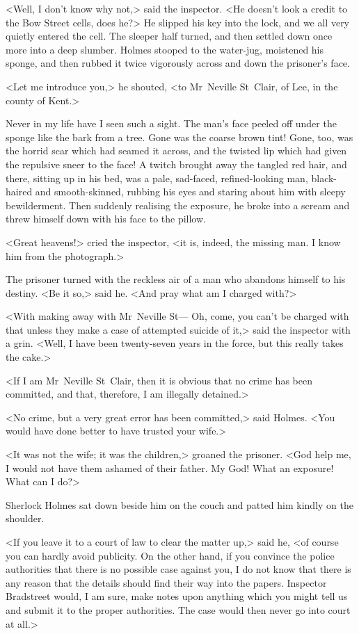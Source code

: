 <Well, I don't know why not,> said the inspector. <He doesn't look a credit to the Bow Street cells, does he?> He slipped his key into the lock, and we all very quietly entered the cell. The sleeper half turned, and then settled down once more into a deep slumber. Holmes stooped to the water-jug, moistened his sponge, and then rubbed it twice vigorously across and down the prisoner's face.

<Let me introduce you,> he shouted, <to Mr~Neville St~Clair, of Lee, in the county of Kent.>

Never in my life have I seen such a sight. The man's face peeled off under the sponge like the bark from a tree. Gone was the coarse brown tint! Gone, too, was the horrid scar which had seamed it across, and the twisted lip which had given the repulsive sneer to the face! A twitch brought away the tangled red hair, and there, sitting up in his bed, was a pale, sad-faced, refined-looking man, black-haired and smooth-skinned, rubbing his eyes and staring about him with sleepy bewilderment. Then suddenly realising the exposure, he broke into a scream and threw himself down with his face to the pillow.

<Great heavens!> cried the inspector, <it is, indeed, the missing man. I know him from the photograph.>

The prisoner turned with the reckless air of a man who abandons himself to his destiny. <Be it so,> said he. <And pray what am I charged with?>

<With making away with Mr~Neville St— Oh, come, you can't be charged with that unless they make a case of attempted suicide of it,> said the inspector with a grin. <Well, I have been twenty-seven years in the force, but this really takes the cake.>

<If I am Mr~Neville St~Clair, then it is obvious that no crime has been committed, and that, therefore, I am illegally detained.>

<No crime, but a very great error has been committed,> said Holmes. <You would have done better to have trusted your wife.>

<It was not the wife; it was the children,> groaned the prisoner. <God help me, I would not have them ashamed of their father. My God! What an exposure! What can I do?>

Sherlock Holmes sat down beside him on the couch and patted him kindly on the shoulder.

<If you leave it to a court of law to clear the matter up,> said he, <of course you can hardly avoid publicity. On the other hand, if you convince the police authorities that there is no possible case against you, I do not know that there is any reason that the details should find their way into the papers. Inspector Bradstreet would, I am sure, make notes upon anything which you might tell us and submit it to the proper authorities. The case would then never go into court at all.>

